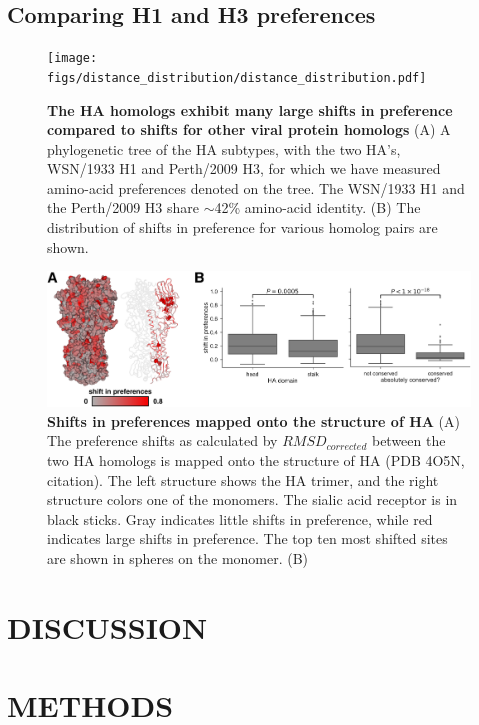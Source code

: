 \documentclass[11pt]{article}
\begin{document}
\subsection*{Comparing H1 and H3 preferences}

\begin{figure}
\centerline{\texttt{[image: figs/distance\_distribution/distance\_distribution.pdf]}}
\caption{\label{fig:distance_distribution}
{\bf The HA homologs exhibit many large shifts in preference compared to shifts for other viral protein homologs}
(A) A phylogenetic tree of the HA subtypes, with the two HA's, WSN/1933 H1 and Perth/2009 H3, for which we have measured amino-acid preferences denoted on the tree. 
The WSN/1933 H1 and the Perth/2009 H3 share $\sim$42\% amino-acid identity.
(B) The distribution of shifts in preference for various homolog pairs are shown.
}
\end{figure}

\begin{figure}
\centerline{\includegraphics[width=\textwidth]{figs/RMSD_heatmap/RMSD_heatmap.pdf}}
\caption{\label{fig:RMSD_heatmap}
{\bf Shifts in preferences mapped onto the structure of HA}
(A) The preference shifts as calculated by $RMSD_{corrected}$ between the two HA homologs is mapped onto the structure of HA (PDB 4O5N, citation). 
The left structure shows the HA trimer, and the right structure colors one of the monomers. 
The sialic acid receptor is in black sticks.
Gray indicates little shifts in preference, while red indicates large shifts in preference.
The top ten most shifted sites are shown in spheres on the monomer.
(B)
}
\end{figure}


\section*{DISCUSSION}


\clearpage
\small

\section*{METHODS}
\label{sec:methods}
\end{document}
